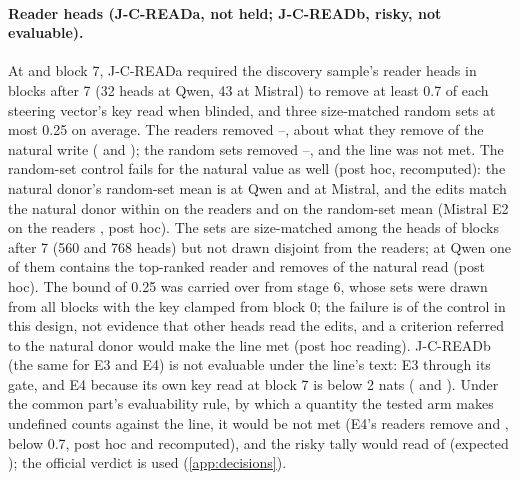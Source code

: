 \paragraph{Reader heads (J-C-READa, not held; J-C-READb, risky, not evaluable).} At \fmtOpt{} and block 7, J-C-READa required the discovery sample's reader heads in blocks after 7 (32 heads at Qwen, 43 at Mistral) %
 to remove at least 0.7 of each steering vector's key read when blinded, and three size-matched random sets at most 0.25 on average. The readers removed \JcReadaKOMin{}--\JcReadaKOMax{}, about what they remove of the natural write (\JcReadaKONatQwenSeven{} and \JcReadaKONatMistralSeven{}); the random sets removed \JcReadaRandMin{}--\JcReadaRandMax{}, and the line was not met. The random-set control fails for the natural value as well (post hoc, recomputed): the natural donor's random-set mean is \JcReadaRandNatQwenSeven{} at Qwen and \JcReadaRandNatMistralSeven{} at Mistral, and the edits match the natural donor within \JcReadaPairMax{} on the readers and on the random-set mean (Mistral E2 on the readers \JcReadaPairEtwoHMistralSeven{}, post hoc). The sets are size-matched among the heads of blocks after 7 (560 and 768 heads) but not drawn disjoint from the readers; at Qwen one of them contains the top-ranked reader and removes \JcReadaSetZeroNatQwenSeven{} of the natural read (post hoc). The bound of 0.25 was carried over from stage 6, whose sets were drawn from all blocks with the key clamped from block 0; the failure is of the control in this design, not evidence that other heads read the edits, and a criterion referred to the natural donor would make the line met (post hoc reading). J-C-READb (the same for E3 and E4) is not evaluable under the line's text: E3 through its gate, and E4 because its own key read at block 7 is below 2 nats (\JcReadbIDKEfouraQwenSeven{} and \JcReadbIDKEfouraMistralSeven{}). Under the common part's evaluability rule, by which a quantity the tested arm makes undefined counts against the line, it would be not met (E4's readers remove \JcReadbKOEfouraQwenSeven{} and \JcReadbKOEfouraMistralSeven{}, below 0.7, post hoc and recomputed), and the risky tally would read \JxRiskyMetABCDAlt{} of \JxRiskyVerdABCDAlt{} (expected \JxRiskyExpABCDAlt{}); the official verdict is used (\cref{app:decisions}). %

